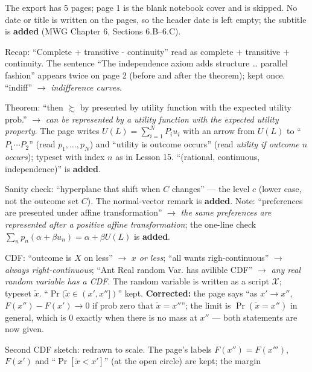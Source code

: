 \documentclass[11pt]{article}
\begin{document}
\begin{transcriptnotes}
  \item The export has 5 pages; page 1 is the blank notebook cover and is skipped. No
        date or title is written on the pages, so the header date is left empty; the
        subtitle is \textbf{added} (MWG Chapter 6, Sections 6.B--6.C).
  \item Recap: ``Complete + transitive - continuity'' read as complete $+$ transitive
        $+$ continuity. The sentence ``The independence axiom adds structure \ldots
        parallel fashion'' appears twice on page 2 (before and after the theorem);
        kept once. ``indiff'' $\to$ \emph{indifference curves}.
  \item Theorem: ``then $\succsim$ by presented by utility function with the expected
        utility prob.'' $\to$ \emph{can be represented by a utility function with the
        expected utility property}. The page writes $U(L)=\sum_{i=1}^N P_i u_i$ with
        an arrow from $U(L)$ to ``$P_1\cdots P_2$'' (read $p_1,\dots,p_N$) and
        ``utility is outcome occurs'' (read \emph{utility if outcome $n$ occurs});
        typeset with index $n$ as in Lesson 15. ``(rational, continuous,
        independence)'' is \textbf{added}.
  \item Sanity check: ``hyperplane that shift when $C$ changes'' --- the level $c$
        (lower case, not the outcome set $C$). The normal-vector remark is
        \textbf{added}. Note: ``preferences are presented under affine
        transformation'' $\to$ \emph{the same preferences are represented after a
        positive affine transformation}; the one-line check
        $\sum_n p_n(\alpha+\beta u_n)=\alpha+\beta U(L)$ is \textbf{added}.
  \item CDF: ``outcome is $X$ on less'' $\to$ \emph{$x$ or less}; ``all wants
        righ-continuous'' $\to$ \emph{always right-continuous}; ``Ant Real random
        Var. has avilible CDF'' $\to$ \emph{any real random variable has a CDF}. The
        random variable is written as a script $\mathcal{X}$; typeset $\tilde x$.
        ``$\Pr(\tilde x\in(x',x''])$'' kept. \textbf{Corrected:} the page says ``as
        $x'\to x''$, $F(x'')-F(x')\to 0$ if prob zero that $\tilde x=x''$''; the
        limit is $\Pr(\tilde x=x'')$ in general, which is $0$ exactly when there is no
        mass at $x''$ --- both statements are now given.
  \item Second CDF sketch: redrawn to scale. The page's labels $F(x'')=F(x''')$,
        $F(x')$ and ``$\Pr[\tilde x<x']$'' (at the open circle) are kept; the margin

\end{transcriptnotes}
\end{document}
